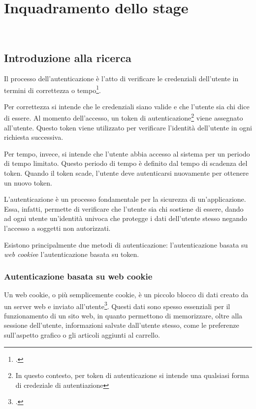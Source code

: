 \chapter{Inquadramento dello stage}
\label{cap:inquadramento-stage}

\\

\section{Introduzione alla ricerca}
Il processo dell'autenticazione è l'atto di verificare le credenziali dell'utente in termini di correttezza o tempo\footcite{site:token-cookie-auth}.

Per correttezza si intende che le credenziali siano valide e che l'utente sia chi dice di essere.
Al momento dell'accesso, un token di autenticazione\footnote{In questo contesto, per token di autenticazione si intende una qualsiasi forma di credeziale di autentiazione} viene assegnato all'utente.
Questo token viene utilizzato per verificare l'identità dell'utente in ogni richiesta successiva.

Per tempo, invece, si intende che l'utente abbia accesso al sistema per un periodo di tempo limitato.
Questo periodo di tempo è definito dal tempo di scadenza del token.
Quando il token scade, l'utente deve autenticarsi nuovamente per ottenere un nuovo token.

L'autenticazione è un processo fondamentale per la sicurezza di un'applicazione.
Essa, infatti, permette di verificare che l'utente sia chi sostiene di essere, dando ad ogni utente un'identità univoca che protegge i dati dell'utente stesso negando l'accesso a soggetti non autorizzati.

Esistono principalmente due metodi di autenticazione: l'autenticazione basata su \emph{\gls{web cookie}}\glsfirstoccur e l'autenticazione basata su token.

\subsection{Autenticazione basata su web cookie}
Un web cookie, o più semplicemente cookie, è un piccolo blocco di dati creato da un server web e inviato all'utente\footcite{site:cookie-wikipedia}.
Questi dati sono spesso essenziali per il funzionamento di un sito web, in quanto permettono di memorizzare, oltre alla sessione dell'utente, informazioni salvate dall'utente stesso, come le preferenze sull'aspetto grafico o gli articoli aggiunti al carrello.

